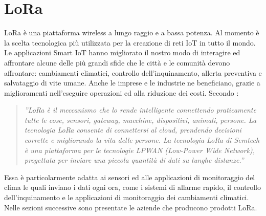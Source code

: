 \documentclass[a4paper]{report} %
\begin{document}
\section{LoRa}
LoRa è una piattaforma wireless a lungo raggio e a bassa potenza. Al momento è la scelta tecnologica più utilizzata per la creazione di reti IoT in tutto il mondo. Le applicazioni Smart IoT hanno migliorato il nostro modo di interagire ed affrontare alcune delle più grandi sfide che le città e le comunità devono affrontare: cambiamenti climatici, controllo dell'inquinamento, allerta preventiva e salvataggio di vite umane. Anche le imprese e le industrie ne beneficiano, grazie a miglioramenti nell'eseguire operazioni ed alla riduzione dei costi. Secondo \cite{art:rif.24}:
\begin{quote}
	\textit{''LoRa è il meccanismo che lo rende intelligente connettendo praticamente tutte le cose, sensori, gateway, macchine, dispositivi, animali, persone. La tecnologia LoRa consente di connettersi al cloud, prendendo decisioni corrette e migliorando la vita delle persone. La tecnologia LoRa di Semtech è una piattaforma per le tecnologie LPWAN (Low-Power Wide Network), progettata per inviare una piccola quantità di dati su lunghe distanze.''}
\end{quote} 
Essa è particolarmente adatta ai sensori ed alle applicazioni di monitoraggio del clima le quali inviano i dati ogni ora, come i sistemi di allarme rapido, il controllo dell'inquinamento e le applicazioni di monitoraggio dei cambiamenti climatici. Nelle sezioni successive sono presentate le aziende che producono prodotti LoRa. 
\end{document}
